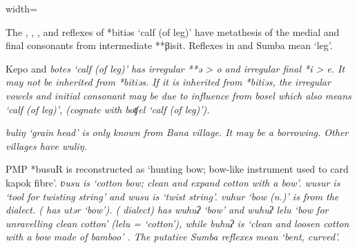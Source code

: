 \begin{table}[p]
\begin{adjustbox}{width=\textwidth}
\begin{threeparttable}
\begin{tablenotes}
				\item[†]	{The , , , and  reflexes of *bitiəs ‘calf
									(of leg)’ have metathesis of the medial
									and final consonants from intermediate **βisit.
									Reflexes in  and Sumba mean ‘leg’.}
				\item[‡]	{Kepo{\Q} and  \it{botes} ‘calf (of leg)’ has irregular
									**ə > \it{o} and irregular final *i > \it{e}.
									It may not be inherited from *bitiəs.
									If it is inherited from *bitiəs,
									the irregular vowels and initial consonant may be due to influence
									from \it{bosel} which also means ‘calf (of leg)’,
									(cognate with  boʧel ‘calf (of leg)’).}
				\item[Δ]	{ \it{buliŋ}
									‘grain head’ is only known from Bana village.
									It may be a borrowing.
									Other villages have \it{wuliŋ.}}
				\item[‖]	{PMP *busuR is reconstructed as
									‘hunting bow; bow-like
									instrument used to card kapok fibre’.
									 \it{ʋusu} is ‘cotton bow; clean
									and expand cotton with a bow’.
									 \it{wusur} is ‘tool for
									twisting string’ and \it{wusu} is ‘twist string’.
									 \it{vuhur} ‘bow (n.)’ is from the  dialect.
									(  has \it{utər} ‘bow’).
									 ( dialect) has \it{wuhuʔ} ‘bow’
									and \it{wuhuʔ lelu} ‘bow for unravelling clean cotton’ (\it{lelu}
									= ‘cotton’), while \it{buhuʔ} is \it{‘}clean
									and loosen cotton with a bow made of bamboo’ \citep[39]{Pampus2010}.
									The putative Sumba reflexes mean ‘bent, curved’.}
			\end{tablenotes}
	\end{threeparttable}
\end{adjustbox}
\end{table}

